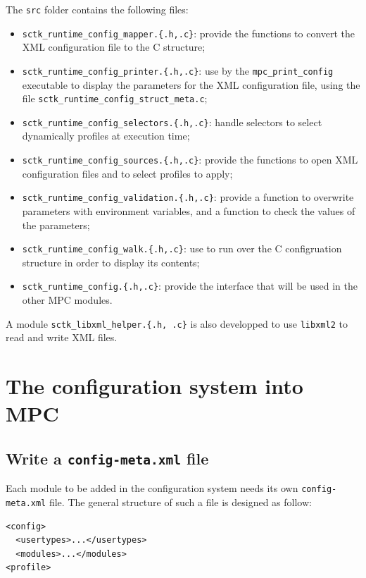 \documentclass{article}
\begin{document}
The \texttt{src} folder contains the following files:
\begin{itemize}
\item \texttt{sctk\_runtime\_config\_mapper.\{.h,.c\}}: provide the functions to convert the XML configuration file to the C structure;
\item \texttt{sctk\_runtime\_config\_printer.\{.h,.c\}}: use by the \texttt{mpc\_print\_config} executable to display the parameters for the XML configuration file, using the file \texttt{sctk\_runtime\_config\_struct\_meta.c};
\item \texttt{sctk\_runtime\_config\_selectors.\{.h,.c\}}: handle selectors to select dynamically profiles at execution time;
\item \texttt{sctk\_runtime\_config\_sources.\{.h,.c\}}: provide the functions to open XML configuration files and to select profiles to apply;
\item \texttt{sctk\_runtime\_config\_validation.\{.h,.c\}}: provide a function to overwrite parameters with environment variables, and a function to check the values of the parameters;
\item \texttt{sctk\_runtime\_config\_walk.\{.h,.c\}}: use to run over the C configruation structure in order to display its contents;
\item \texttt{sctk\_runtime\_config.\{.h,.c\}}: provide the interface that will be used in the other MPC modules.
\end{itemize}

\noindent A module \texttt{sctk\_libxml\_helper.\{.h, .c\}} is also developped to use \texttt{libxml2} to read and write XML files.

\section{The configuration system into MPC}

\subsection{Write a \texttt{config-meta.xml} file}

Each module to be added in the configuration system needs its own \texttt{config-meta.xml} file. The general structure of such a file is designed as follow:

\lstset{language=XML}
\begin{lstlisting}[title=General structure of a \texttt{config-meta.xml} file]
<config>
  <usertypes>...</usertypes>
  <modules>...</modules>
<profile>
\end{lstlisting}
\end{document}
